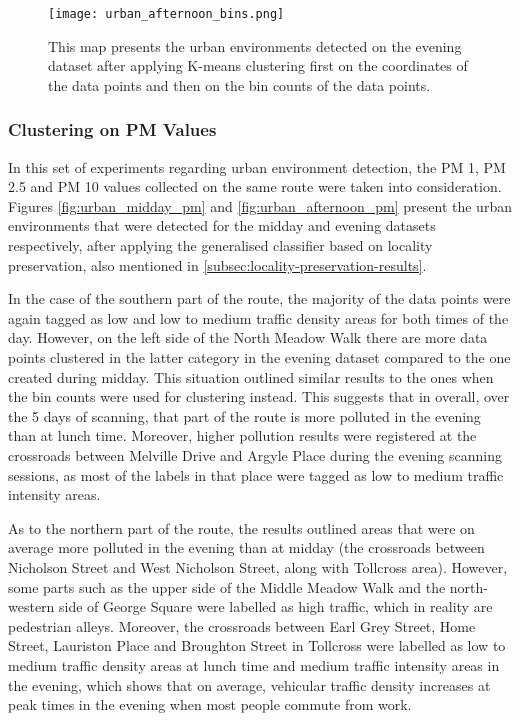 \documentclass[bsc,frontabs,twoside,singlespacing, parskip,deptreport]{infthesis}     %
\begin{document}
\begin{figure}[h!]
  \center
  \texttt{[image: urban\_afternoon\_bins.png]}
  \caption{This map presents the urban environments detected on the evening dataset after applying K-means clustering first on the coordinates of the data points and then on the bin counts of the data points.}
  \label{fig:urban_afternoon_bins}
\end{figure}

\subsubsection*{Clustering on PM Values}

In this set of experiments regarding urban environment detection, the PM 1, PM 2.5 and PM 10 values collected on the same route were taken into consideration. Figures \ref{fig:urban_midday_pm} and \ref{fig:urban_afternoon_pm} present the urban environments that were detected for the midday and evening datasets respectively, after applying the generalised classifier based on locality preservation, also mentioned in \ref{subsec:locality-preservation-results}.

In the case of the southern part of the route, the majority of the data points were again tagged as low and low to medium traffic density areas for both times of the day. However, on the left side of the North Meadow Walk there are more data points clustered in the latter category in the evening dataset compared to the one created during midday. This situation outlined similar results to the ones when the bin counts were used for clustering instead. This suggests that in overall, over the 5 days of scanning, that part of the route is more polluted in the evening than at lunch time. Moreover, higher pollution results were registered at the crossroads between Melville Drive and Argyle Place during the evening scanning sessions, as most of the labels in that place were tagged as low to medium traffic intensity areas.

As to the northern part of the route, the results outlined areas that were on average more polluted in the evening than at midday (the crossroads between Nicholson Street and West Nicholson Street, along with Tollcross area). However, some parts such as the upper side of the Middle Meadow Walk and the north-western side of George Square were labelled as high traffic, which in reality are pedestrian alleys. Moreover, the crossroads between Earl Grey Street, Home Street, Lauriston Place and Broughton Street in Tollcross were labelled as low to medium traffic density areas at lunch time and medium traffic intensity areas in the evening, which shows that on average, vehicular traffic density increases at peak times in the evening when most people commute from work.
\end{document}
